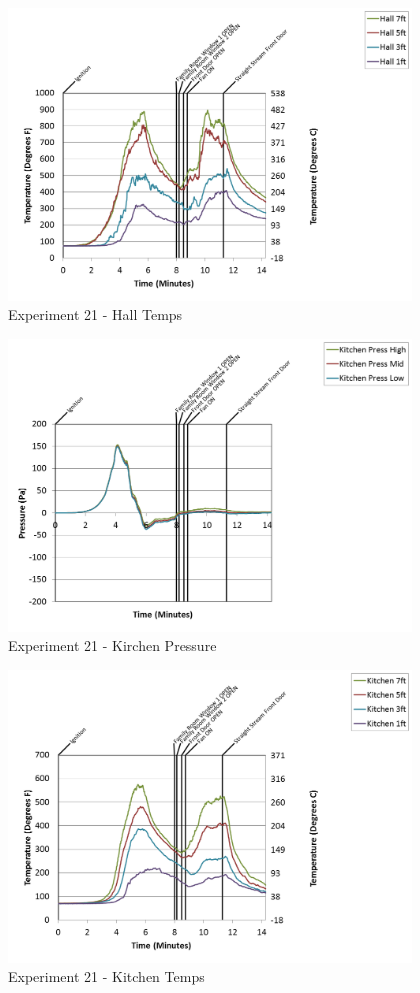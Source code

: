 \documentclass{article}
\begin{document}
\begin{appendices}
\begin{figure}[h!]
	\centering
	\includegraphics[height=3.05in]{0_Images/Results_Charts/Exp_21_Charts/HallTemps.png}
	\caption{Experiment 21 - Hall Temps}
\end{figure}

\clearpage

\begin{figure}[h!]
	\centering
	\includegraphics[height=3.05in]{0_Images/Results_Charts/Exp_21_Charts/KirchenPressure.png}
	\caption{Experiment 21 - Kirchen Pressure}
\end{figure}


\begin{figure}[h!]
	\centering
	\includegraphics[height=3.05in]{0_Images/Results_Charts/Exp_21_Charts/KitchenTemps.png}
	\caption{Experiment 21 - Kitchen Temps}
\end{figure}


\end{appendices}
\end{document}
